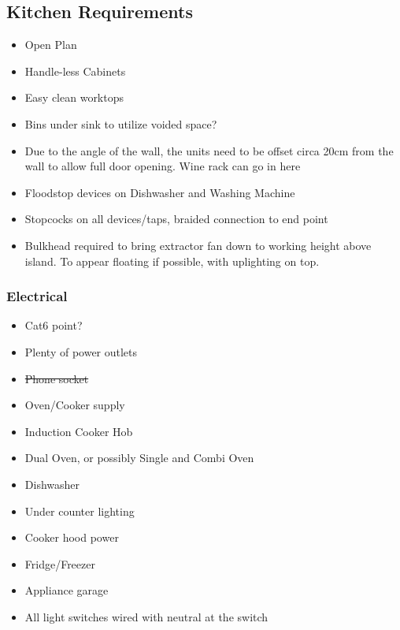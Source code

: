 \subsection{Kitchen Requirements}
\begin{itemize}
\item Open Plan
\item Handle-less Cabinets
\item Easy clean worktops
\item Bins under sink to utilize voided space?
\item Due to the angle of the wall, the units need to be offset circa 20cm from the wall to allow full door opening. Wine rack can go in here
\item Floodstop devices on Dishwasher and Washing Machine 
\item Stopcocks on all devices/taps, braided connection to end point
\item Bulkhead required to bring extractor fan down to working height above island. To appear floating if possible, with uplighting on top.
\end{itemize}

\subsubsection{Electrical}
\begin{itemize}
\item Cat6 point?
\item Plenty of power outlets
\item \sout{Phone socket}
\item Oven/Cooker supply
\item Induction Cooker Hob
\item Dual Oven, or possibly Single and Combi Oven
\item Dishwasher
\item Under counter lighting
\item Cooker hood power
\item Fridge/Freezer
\item Appliance garage
\item All light switches wired with neutral at the switch
\end{itemize}
